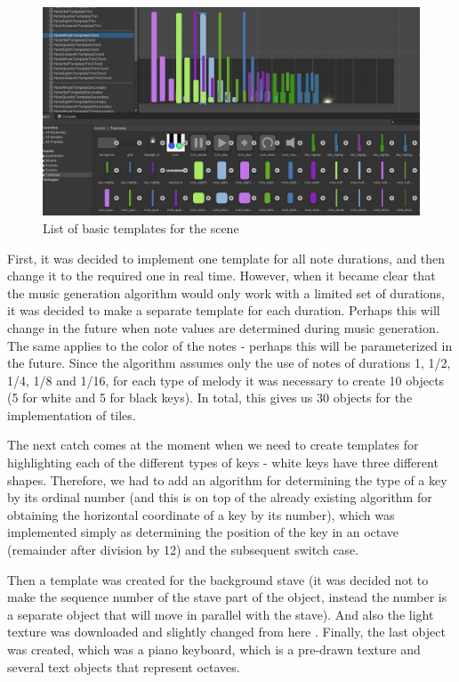 \documentclass[thesis=B,english]{FITthesis}[2019/12/23]
\begin{document}
\begin{figure}[ht]
            \includegraphics[width=\textwidth]{Objects2.png}
            \caption{List of basic templates for the scene}
            \label{fig:Objects2}
\end{figure}

First, it was decided to implement one template for all note durations, and then change it to the required one in real time. However, when it became clear that the music generation algorithm would only work with a limited set of durations, it was decided to make a separate template for each duration. Perhaps this will change in the future when note values are determined during music generation. The same applies to the color of the notes - perhaps this will be parameterized in the future. Since the algorithm assumes only the use of notes of durations 1, 1/2, 1/4, 1/8 and 1/16, for each type of melody it was necessary to create 10 objects (5 for white and 5 for black keys). In total, this gives us 30 objects for the implementation of tiles.

The next catch comes at the moment when we need to create templates for highlighting each of the different types of keys - white keys have three different shapes. Therefore, we had to add an algorithm for determining the type of a key by its ordinal number (and this is on top of the already existing algorithm for obtaining the horizontal coordinate of a key by its number), which was implemented simply as determining the position of the key in an octave (remainder after division by 12) and the subsequent switch case.

Then a template was created for the background stave (it was decided not to make the sequence number of the stave part of the object, instead the number is a separate object that will move in parallel with the stave). And also the light texture was downloaded and slightly changed from here \cite{FreePNGPictures}. Finally, the last object was created, which was a piano keyboard, which is a pre-drawn texture and several text objects that represent octaves.
\end{document}
